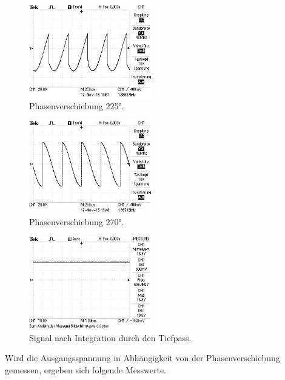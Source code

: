 \begin{figure}
  \centering
  \includegraphics[width=0.48\textwidth]{bilder/Ohne Rauschen/4.JPG}
  \caption{Phasenverschiebung 225°.}
  \label{fig:bild4}
\end{figure}

\begin{figure}
  \centering
  \includegraphics[width=0.48\textwidth]{bilder/Ohne Rauschen/5.JPG}
  \caption{Phasenverschiebung 270°.}
  \label{fig:bild5}
\end{figure}

\begin{figure}
  \centering
  \includegraphics[width=0.48\textwidth]{bilder/Ohne Rauschen/6.JPG}
  \caption{Signal nach Integration durch den Tiefpass.}
  \label{fig:bild6}
\end{figure}

Wird die Ausgangsspannung in Abhängigkeit von der Phasenverschiebung gemessen, ergeben sich folgende Messwerte.

